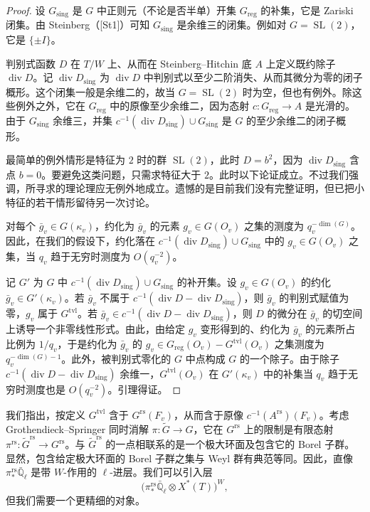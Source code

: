 \begin{proof}
设 $G_{\mathrm{sing}}$ 是 $G$ 中正则元（不论是否半单）开集 $G_{\mathrm{reg}}$ 的补集，它是 Zariski 闭集。由 Steinberg（[St1]）可知 $G_{\mathrm{sing}}$ 是余维三的闭集。例如对 $G=\operatorname{SL}(2)$，它是 $\{\pm I\}$。

判别式函数 $D$ 在 $T/W$ 上、从而在 Steinberg–Hitchin 底 $A$ 上定义既约除子 $\operatorname{div}D$。记 $\operatorname{div}D_{\mathrm{sing}}$ 为 $\operatorname{div}D$ 中判别式以至少二阶消失、从而其微分为零的闭子概形。这个闭集一般是余维二的，故当 $G=\operatorname{SL}(2)$ 时为空，但也有例外。除这些例外之外，它在 $G_{\mathrm{reg}}$ 中的原像至少余维二，因为态射 $c:G_{\mathrm{reg}}\to A$ 是光滑的。由于 $G_{\mathrm{sing}}$ 余维三，并集 $c^{-1}(\operatorname{div}D_{\mathrm{sing}})\cup G_{\mathrm{sing}}$ 是 $G$ 的至少余维二的闭子概形。

最简单的例外情形是特征为 $2$ 时的群 $\operatorname{SL}(2)$，此时 $D=b^2$，因为 $\operatorname{div}D_{\mathrm{sing}}$ 含点 $b=0$。要避免这类问题，只需求特征大于 $2$。此时以下论证成立。不过我们强调，所寻求的理论理应无例外地成立。遗憾的是目前我们没有完整证明，但已把小特征的若干情形留待另一次讨论。

对每个 $\bar g_v\in G(\kappa_v)$，约化为 $\bar g_v$ 的元素 $g_v\in G(O_v)$ 之集的测度为 $q_v^{-\dim(G)}$。因此，在我们的假设下，约化落在 $c^{-1}(\operatorname{div}D_{\mathrm{sing}})\cup G_{\mathrm{sing}}$ 中的 $g_v\in G(O_v)$ 之集，当 $q_v$ 趋于无穷时测度为 $O(q_v^{-2})$。

记 $G'$ 为 $G$ 中 $c^{-1}(\operatorname{div}D_{\mathrm{sing}})\cup G_{\mathrm{sing}}$ 的补开集。设 $g_v\in G(O_v)$ 的约化 $\bar g_v\in G'(\kappa_v)$。若 $\bar g_v$ 不属于 $c^{-1}(\operatorname{div}D-\operatorname{div}D_{\mathrm{sing}})$，则 $\bar g_v$ 的判别式赋值为零，$g_v$ 属于 $G^{\mathrm{tvl}}$。若 $\bar g_v\in c^{-1}(\operatorname{div}D-\operatorname{div}D_{\mathrm{sing}})$，则 $D$ 的微分在 $\bar g_v$ 的切空间上诱导一个非零线性形式。由此，由给定 $g_v$ 变形得到的、约化为 $\bar g_v$ 的元素所占比例为 $1/q_v$，于是约化为 $\bar g_v$ 的 $g_v\in G_{\mathrm{reg}}(O_v)-G^{\mathrm{tvl}}(O_v)$ 之集测度为 $q_v^{-\dim(G)-1}$。此外，被判别式零化的 $G$ 中点构成 $G$ 的一个除子。由于除子 $c^{-1}(\operatorname{div}D-\operatorname{div}D_{\mathrm{sing}})$ 余维一，$G^{\mathrm{tvl}}(O_v)$ 在 $G'(\kappa_v)$ 中的补集当 $q_v$ 趋于无穷时测度也是 $O(q_v^{-2})$。引理得证。
\end{proof}

我们指出，按定义 $G^{\mathrm{tvl}}$ 含于 $G^{\mathrm{rs}}(F_v)$，从而含于原像 $c^{-1}(A^{\mathrm{rs}})(F_v)$。考虑 Grothendieck–Springer 同时消解 $\pi:\tilde G\to G$，它在 $G^{\mathrm{rs}}$ 上的限制是有限态射 $\pi^{\mathrm{rs}}:\tilde G^{\mathrm{rs}}\to G^{\mathrm{rs}}$。与 $\tilde G^{\mathrm{rs}}$ 的一点相联系的是一个极大环面及包含它的 Borel 子群。显然，包含给定极大环面的 Borel 子群之集与 Weyl 群有典范等同。因此，直像 $\pi^{\mathrm{rs}}_*\bar{\mathbb Q}_\ell$ 是带 $W$-作用的 $\ell$-进层。我们可以引入层
\begin{equation}\tag{5.9}
\bigl(\pi^{\mathrm{rs}}_*\bar{\mathbb Q}_\ell\otimes X^*(T)\bigr)^W,
\end{equation}
但我们需要一个更精细的对象。

